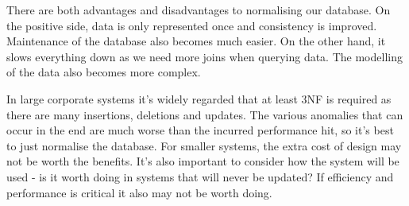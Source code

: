 \documentclass{article}
\begin{document}
	\par 
	There are both advantages and disadvantages to normalising our database. On the positive side, data is only represented once and consistency is improved. Maintenance of the database also becomes much easier. On the other hand, it slows everything down as we need more joins when querying data. The modelling of the data also becomes more complex.
	
	\par In large corporate systems it's widely regarded that at least 3NF is required as there are many insertions, deletions and updates. The various anomalies that can occur in the end are much worse than the incurred performance hit, so it's best to just normalise the database. For smaller systems, the extra cost of design may not be worth the benefits. It's also important to consider how the system will be used - is it worth doing in systems that will never be updated? If efficiency and performance is critical it also may not be worth doing.
		
	
\end{document}
